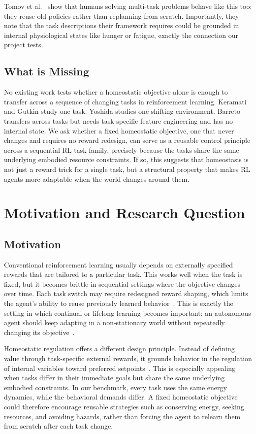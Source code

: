 \documentclass[sigplan,10pt]{acmart}
\begin{document}
Tomov et al.~\cite{Tomov} show that humans solving multi-task
problems behave like this too: they reuse old policies rather than
replanning from scratch. Importantly, they note that the task
descriptions their framework requires could be grounded in internal
physiological states like hunger or fatigue,
exactly the connection our project tests.

\subsection{What is Missing}

No existing work tests whether a homeostatic objective alone is enough
to transfer across a sequence of changing tasks in reinforcement
learning. Keramati and Gutkin study one task. Yoshida studies one
shifting environment. Barreto transfers across tasks but needs
task-specific feature engineering and has no internal state. We ask
whether a fixed homeostatic objective, one that never changes and
requires no reward redesign, can serve as a reusable control
principle across a sequential RL task family, precisely because the
tasks share the same underlying embodied resource constraints. If so,
this suggests that homeostasis is not just a reward trick for a single
task, but a structural property that makes RL agents more adaptable
when the world changes around them.

\section{Motivation and Research Question}
\subsection{Motivation}
Conventional reinforcement learning usually depends on externally
specified rewards that are tailored to a particular task. This works
well when the task is fixed, but it becomes brittle in sequential
settings where the objective changes over time. Each task switch may
require redesigned reward shaping, which limits the agent's ability to
reuse previously learned behavior~\cite{Yoshida2016}. This is exactly
the setting in which continual or lifelong learning becomes important:
an autonomous agent should keep adapting in a non-stationary world
without repeatedly changing its objective~\cite{Parisi2019}.

Homeostatic regulation offers a different design principle. Instead of
defining value through task-specific external rewards, it grounds
behavior in the regulation of internal variables toward preferred
setpoints~\cite{keramati2014,konidaris2006}. This is especially
appealing when tasks differ in their immediate goals but share the same
underlying embodied constraints. In our benchmark, every task uses the
same energy dynamics, while the behavioral demands differ. A fixed
homeostatic objective could therefore encourage reusable strategies such
as conserving energy, seeking resources, and avoiding hazards, rather
than forcing the agent to relearn them from scratch after each task
change.
\end{document}
